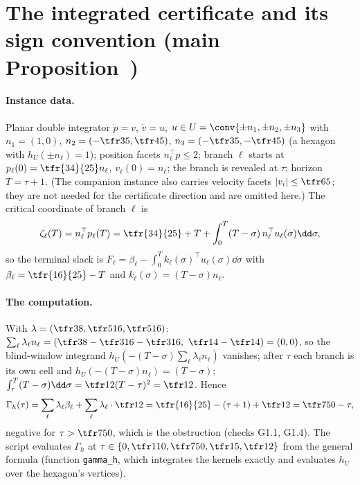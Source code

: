 \section{The integrated certificate and its sign convention (main Proposition~)}\label{si:integrated}

\paragraph{Instance data.} Planar double integrator $\dot p=v$, $\dot v=u$, $u\in U=\conv\{\pm n_1,\pm n_2,\pm n_3\}$ with $n_1=(1,0)$, $n_2=(-\tfr35,\tfr45)$, $n_3=(-\tfr35,-\tfr45)$ (a hexagon with $h_U(\pm n_\ell)=1$); position facets $n_\ell^\top p\le2$; branch $\ell$ starts at $p_\ell(0)=\tfr{34}{25}n_\ell$, $v_\ell(0)=n_\ell$; the branch is revealed at $\tau$; horizon $T=\tau+1$. (The companion instance also carries velocity facets $|v_i|\le\tfr65$; they are not needed for the certificate direction and are omitted here.) The critical coordinate of branch $\ell$ is
\[
\zeta_\ell(T)=n_\ell^\top p_\ell(T)=\tfr{34}{25}+T+\int_0^T(T-\sigma)\,n_\ell^\top u_\ell(\sigma)\dd\sigma,
\]
so the terminal slack is $F_\ell=\beta_\ell-\int_0^Tk_\ell(\sigma)^\top u_\ell(\sigma)\dd\sigma$ with $\beta_\ell=\tfr{16}{25}-T$ and $k_\ell(\sigma)=(T-\sigma)n_\ell$.

\paragraph{The computation.} With $\lambda=(\tfr38,\tfr5{16},\tfr5{16})$: $\sum_\ell\lambda_\ell n_\ell=(\tfr38-\tfr3{16}-\tfr3{16},\ \tfr14-\tfr14)=(0,0)$, so the blind-window integrand $h_U(-(T-\sigma)\sum_\ell\lambda_\ell n_\ell)$ vanishes; after $\tau$ each branch is its own cell and $h_U(-(T-\sigma)n_\ell)=(T-\sigma)$; $\int_\tau^{T}(T-\sigma)\dd\sigma=\tfr12(T-\tau)^2=\tfr12$. Hence
\[
\Gamma_h(\tau)=\sum_\ell\lambda_\ell\beta_\ell+\sum_\ell\lambda_\ell\cdot\tfr12=\tfr{16}{25}-(\tau+1)+\tfr12=\tfr7{50}-\tau ,
\]
negative for $\tau>\tfr7{50}$, which is the obstruction (checks G1.1, G1.4). The script evaluates $\Gamma_h$ at $\tau\in\{0,\tfr1{10},\tfr7{50},\tfr15,\tfr12\}$ from the general formula (function \texttt{gamma\_h}, which integrates the kernels exactly and evaluates $h_U$ over the hexagon's vertices).

